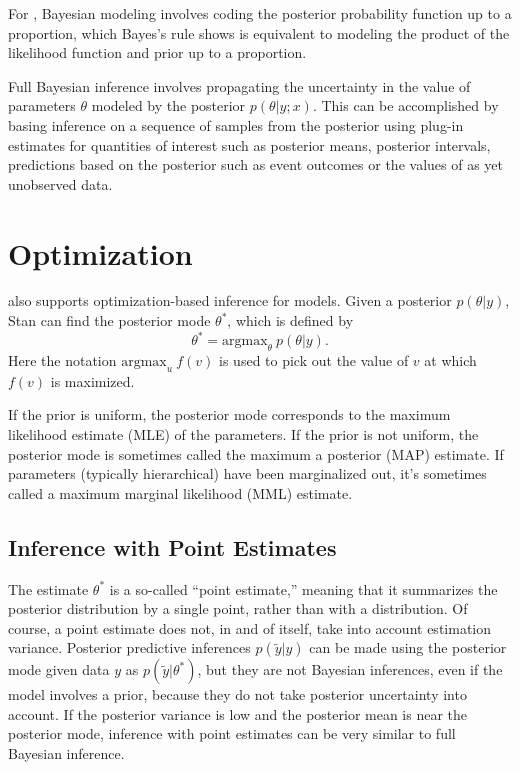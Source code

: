 For \Stan, Bayesian modeling involves coding the posterior probability
function up to a proportion, which Bayes's rule shows is equivalent to
modeling the product of the likelihood function and prior up to a
proportion.

Full Bayesian inference involves propagating the uncertainty in the
value of parameters $\theta$ modeled by the posterior $p(\theta|y;x)$.
This can be accomplished by basing inference on a sequence of samples
from the posterior using plug-in estimates for quantities of interest
such as posterior means, posterior intervals, predictions based on the
posterior such as event outcomes or the values of as yet unobserved
data.


\section{Optimization}

\Stan also supports optimization-based inference for models.  Given a
posterior $p(\theta|y)$, Stan can find the posterior mode $\theta^*$,
which is defined by
%
\[
\theta^{*} = \mbox{argmax}_{\theta} \ p(\theta|y).
\]
%
Here the notation $\mbox{argmax}_u \ f(v)$ is used to pick out the value
of $v$ at which $f(v)$ is maximized.  

If the prior is uniform, the posterior mode corresponds to the maximum
likelihood estimate (MLE) of the parameters.  If the prior is not
uniform, the posterior mode is sometimes called the maximum a
posterior (MAP) estimate.  If parameters (typically hierarchical) have
been marginalized out, it's sometimes called a maximum marginal
likelihood (MML) estimate. 


\subsection{Inference with Point Estimates}

The estimate $\theta^{*}$ is a so-called ``point estimate,'' meaning
that it summarizes the posterior distribution by a single point,
rather than with a distribution.  Of course, a point estimate does
not, in and of itself, take into account estimation variance.
Posterior predictive inferences $p(\tilde{y} | y)$ can be made using
the posterior mode given data $y$ as $p(\tilde{y}|\theta^*)$, but they
are not Bayesian inferences, even if the model involves a prior,
because they do not take posterior uncertainty into account.  If the
posterior variance is low and the posterior mean is near the posterior
mode, inference with point estimates can be very similar to full
Bayesian inference.

